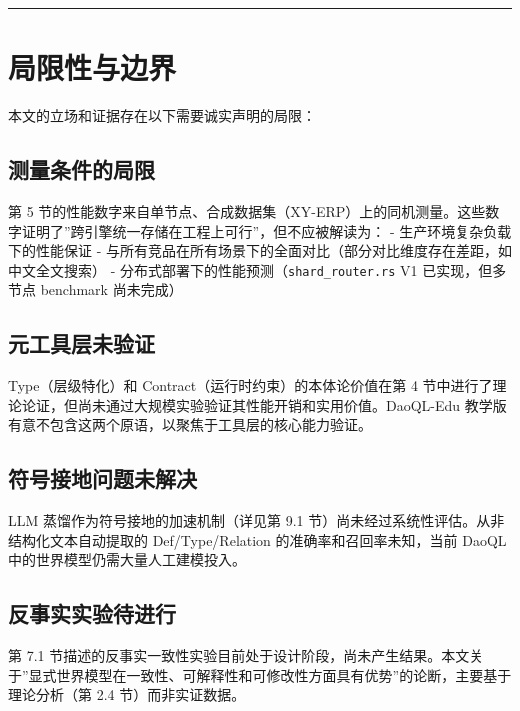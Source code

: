 \documentclass[11pt,a4paper]{ctexart}
\begin{document}
\begin{center}\rule{0.5\linewidth}{0.5pt}\end{center}

\section{局限性与边界}\label{ux5c40ux9650ux6027ux4e0eux8fb9ux754c}

本文的立场和证据存在以下需要诚实声明的局限：

\subsection{测量条件的局限}\label{ux6d4bux91cfux6761ux4ef6ux7684ux5c40ux9650}

第 5
节的性能数字来自单节点、合成数据集（XY-ERP）上的同机测量。这些数字证明了''跨引擎统一存储在工程上可行''，但不应被解读为：
- 生产环境复杂负载下的性能保证 -
与所有竞品在所有场景下的全面对比（部分对比维度存在差距，如中文全文搜索）
- 分布式部署下的性能预测（\texttt{shard\_router.rs} V1 已实现，但多节点
benchmark 尚未完成）

\subsection{元工具层未验证}\label{ux5143ux5de5ux5177ux5c42ux672aux9a8cux8bc1}

Type（层级特化）和 Contract（运行时约束）的本体论价值在第 4
节中进行了理论论证，但尚未通过大规模实验验证其性能开销和实用价值。DaoQL-Edu
教学版有意不包含这两个原语，以聚焦于工具层的核心能力验证。

\subsection{符号接地问题未解决}\label{ux7b26ux53f7ux63a5ux5730ux95eeux9898ux672aux89e3ux51b3}

LLM 蒸馏作为符号接地的加速机制（详见第 9.1
节）尚未经过系统性评估。从非结构化文本自动提取的 Def/Type/Relation
的准确率和召回率未知，当前 DaoQL 中的世界模型仍需大量人工建模投入。

\subsection{反事实实验待进行}\label{ux53cdux4e8bux5b9eux5b9eux9a8cux5f85ux8fdbux884c}

第 7.1
节描述的反事实一致性实验目前处于设计阶段，尚未产生结果。本文关于''显式世界模型在一致性、可解释性和可修改性方面具有优势''的论断，主要基于理论分析（第
2.4 节）而非实证数据。
\end{document}
